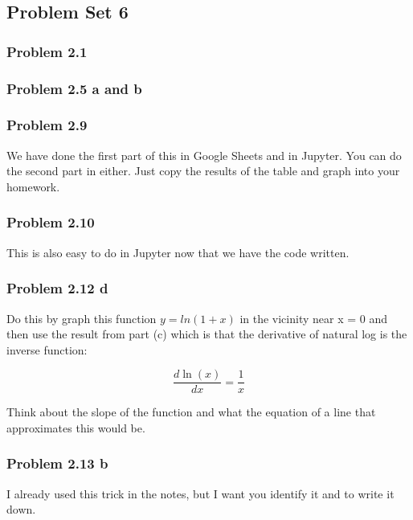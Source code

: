\documentclass[11pt]{article}
\begin{document}
    \subsection{Problem Set 6}\label{problem-set-6}

\subsubsection{Problem 2.1}\label{problem-2.1}

\subsubsection{Problem 2.5 a and b}\label{problem-2.5-a-and-b}

\subsubsection{Problem 2.9}\label{problem-2.9}

We have done the first part of this in Google Sheets and in Jupyter. You
can do the second part in either. Just copy the results of the table and
graph into your homework.

\subsubsection{Problem 2.10}\label{problem-2.10}

This is also easy to do in Jupyter now that we have the code written.

\subsubsection{Problem 2.12 d}\label{problem-2.12-d}

Do this by graph this function \(y=ln(1+x)\) in the vicinity near x = 0
and then use the result from part (c) which is that the derivative of
natural log is the inverse function:

\[ \frac{d \ln(x)}{dx} = \frac{1}{x} \]

Think about the slope of the function and what the equation of a line
that approximates this would be.

\subsubsection{Problem 2.13 b}\label{problem-2.13-b}

I already used this trick in the notes, but I want you identify it and
to write it down.
\end{document}
